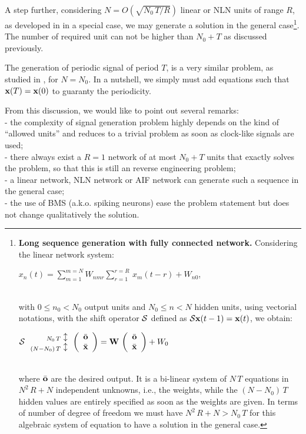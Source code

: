 A step further, considering $N = O(\sqrt{N_0\,T/R})$ linear or NLN units of range $R$, as developed in \cite{rostro-gonzalez-cessac-etal:10} in a special case, we may generate a solution in the general case\footnote{ {\bf Long sequence generation with fully connected network.} Considering the linear network system:
\\\centerline{$x_n(t) = \sum_{m = 1}^{m  = N} W_{nmr} \sum_{r= 1}^{r=R} \, x_m(t-r) + W_{n0}$,}\\
with $0 \leq n_0 < N_0$ output units and $N_0 \leq n < N$ hidden units, using vectorial notations, with the shift operator ${\cal S}$ defined as ${\cal S} {\bf x}(t-1) = {\bf x}(t)$, we obtain:
\\ \centerline{${\cal S} \, \begin{array}{r}{}_{N_0\,T}\updownarrow\\ {}_{(N-N_0)\,T}\updownarrow \end{array}
\left(\begin{array}{c} \bar{\bf o} \\ \bar{\bf x} \end{array}\right) = {\bf W} \, \left(\begin{array}{c} \bar{\bf o} \\ \bar{\bf x} \end{array}\right) + W_{0}$}\\ where $\bar{\bf o}$ are the desired output. It is a bi-linear system of $N\,T$ equations in $N^2\,R + N$ independent unknowns, i.e., the weights, while the $(N-N_0)\,T$ hidden values are entirely specified as soon as the weights are given. In terms of number of degree of freedom we must have $N^2\,R + N > N_0 \,T$ for this algebraic system of equation to have a solution in the general case.}. The number of required unit can not be higher than $N_0 + T$ as discussed previously.

The generation of periodic signal of period $T$, is a very similar problem, as studied in \cite{rostro-gonzalez-cessac-etal:10}, for $N=N_0$. In a nutshell, we simply must add equations such that ${\bf x}(T) = {\bf x}(0)$ to guaranty the periodicity.

From this discussion, we would like to point out several remarks:
\\ - the complexity of signal generation problem highly depends on the kind of ``allowed units'' and reduces to a trivial problem as soon as clock-like signals are used;
\\ - there always exist a $R=1$ network of at most $N_0 + T$ units that exactly solves the problem, so that this is still an reverse engineering problem;
\\ - a linear network, NLN network or AIF network can generate such a sequence in the general case;
\\ - the use of BMS (a.k.o. spiking neurons) ease the problem statement but does not change qualitatively the solution.

